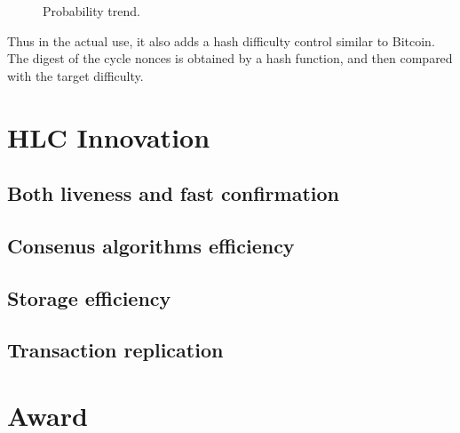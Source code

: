 \documentclass[a4paper,11pt]{article}
\begin{document}
\begin{figure}[h]
	\centerline{%
	}
	\caption{Probability trend.}
\end{figure}

Thus in the actual use, it also adds a hash difficulty control similar to Bitcoin. The digest of the cycle nonces is obtained by a hash function,
and then compared with the target difficulty.

\section{HLC Innovation}
\subsection{Both liveness and fast confirmation} 
\subsection{Consenus algorithms efficiency} 
\subsection{Storage efficiency} 
\subsection{Transaction replication} 

\section{Award}
\end{document}
